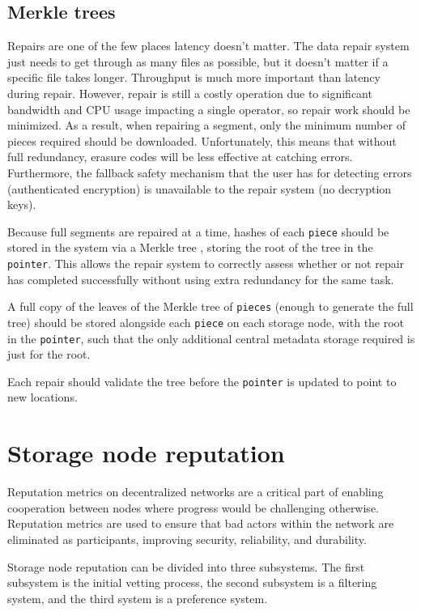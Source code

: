 \documentclass[11pt,fleqn,openany]{book}
\newcommand{\x}[1]{{\tt #1}} \newcommand{\code}[1]{{\em #1}}
\begin{document}
\subsection{Merkle trees}

Repairs are one of the few places latency doesn't matter. The data repair system
just needs to get through as many files as possible, but it doesn't matter if
a specific file takes longer. Throughput is much more important than
latency during repair. However, repair
is still a costly operation due to significant bandwidth and CPU usage
impacting a single operator, so repair work should be minimized.
As a result, when repairing a segment,
only the minimum number of pieces required should be downloaded.
Unfortunately, this means that
without full redundancy, erasure codes will be less effective at catching
errors. Furthermore, the fallback safety mechanism that the user has for detecting
errors (authenticated encryption) is unavailable to the repair system (no
decryption keys).

Because full segments are repaired at a time, hashes of
each \x{piece} should be stored in the system via a Merkle tree
\cite{merkle-tree}, storing the root of the tree in the \x{pointer}. This allows
the repair system to correctly assess whether or not repair has completed
successfully without using extra redundancy for the same task.

A full copy of the leaves of the Merkle tree of \x{pieces} (enough to generate
the full tree) should be stored alongside each \x{piece} on each storage node,
with the root in the \x{pointer}, such that the only additional central
metadata storage required is just for the root.

Each repair should validate the tree before the \x{pointer} is updated to
point to new locations.

\section{Storage node reputation}

Reputation metrics on decentralized networks are a critical part of
enabling cooperation
between nodes
where progress would be challenging otherwise. Reputation metrics
are used to ensure that bad actors
within the network are eliminated as participants, improving security,
reliability, and durability.

Storage node reputation can be divided into three subsystems. The first
subsystem is the initial vetting process, the second subsystem is a filtering
system, and the third system is a preference system.
\end{document}
